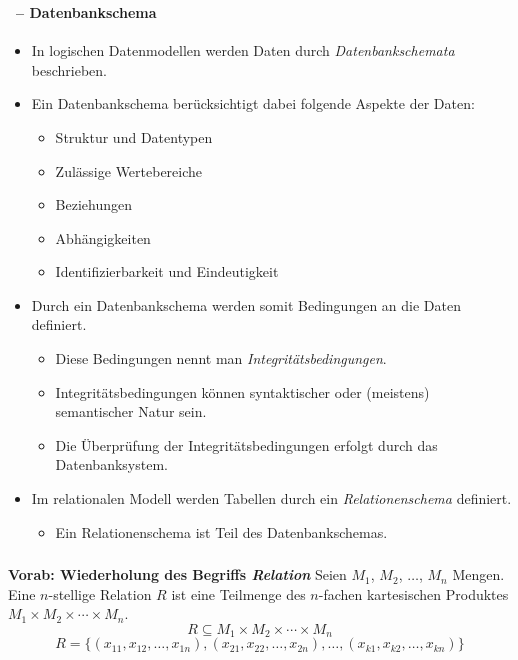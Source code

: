 \begin{frame}
\frametitle{\insertsection}
\framesubtitle{\insertsubsection \ -- Datenbankschema}
\onslide
\begin{itemize}
	\item In logischen Datenmodellen werden Daten durch \emph{Datenbankschemata} beschrieben.
	\pause
	\item Ein Datenbankschema berücksichtigt dabei folgende Aspekte der Daten:
	\begin{itemize} 
		\item Struktur und Datentypen
		\item Zul\"assige Wertebereiche 
		\item Beziehungen
		\item Abh\"angigkeiten
		\item Identifizierbarkeit und Eindeutigkeit
	\end{itemize}
	\pause
	\item Durch ein Datenbankschema werden somit Bedingungen an die Daten definiert. 
	\begin{itemize}
		\item Diese Bedingungen nennt man \emph{Integrit\"atsbedingungen}.
		\item Integrit\"atsbedingungen k\"onnen syntaktischer oder (meistens) semantischer Natur sein.
		\item Die \"Uberpr\"ufung der Integrit\"atsbedingungen erfolgt durch das Datenbanksystem.
	\end{itemize}
	\pause
	\item Im relationalen Modell werden Tabellen durch ein \emph{Relationenschema} definiert.
	\begin{itemize}
		\item Ein Relationenschema ist Teil des Datenbankschemas.
	\end{itemize}	
\end{itemize}
\end{frame}

\begin{frame}
\frametitle{\insertsection}
\framesubtitle{\insertsubsection}
\begin{block}{\textbf{Vorab: Wiederholung des Begriffs \emph{Relation}}}
Seien $M_1$, $M_2$, $\ldots$, $M_n$ Mengen. Eine $n$-stellige Relation $R$ ist eine Teilmenge des $n$-fachen 
kartesischen Produktes $M_1 \times M_2 \times \cdots \times M_n$.
\begin{equation*} 
R \subseteq M_1 \times M_2 \times \cdots \times M_n
\end{equation*} 
\begin{equation*} 
R = \{(x_{11}, x_{12},\dots,x_{1n}),(x_{21}, x_{22},\dots,x_{2n}),\dots,(x_{k1}, x_{k2},\dots,x_{kn})\}
\end{equation*} 
\end{block}
\end{frame}

